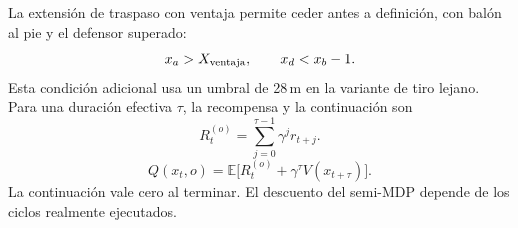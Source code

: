 La extensión de traspaso con ventaja permite ceder antes a definición, con balón
al pie y el defensor superado:
\[
    x_a>X_{\rm ventaja},\qquad x_d<x_b-1.
\]
Esta condición adicional usa un umbral de 28\,m en la variante de tiro lejano.
Para una duración efectiva $\tau$, la recompensa y la continuación son
\[
    R_t^{(o)}=\sum_{j=0}^{\tau-1}\gamma^j r_{t+j}.
\]
\[
    Q(x_t,o)=\mathbb{E}\bigl[R_t^{(o)}+\gamma^\tau V(x_{t+\tau})\bigr].
\]
La continuación vale cero al terminar. El descuento del semi-MDP depende de
los ciclos realmente ejecutados.
